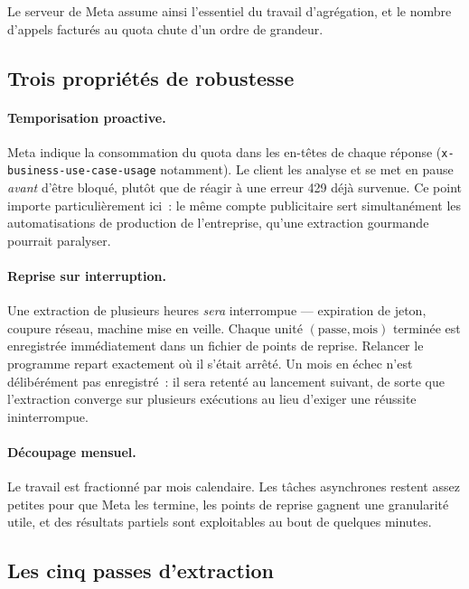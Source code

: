 \documentclass[11pt,a4paper]{article}
\newcommand{\code}[1]{\texttt{\small #1}}
\begin{document}
Le serveur de Meta assume ainsi l'essentiel du travail d'agrégation, et le
nombre d'appels facturés au quota chute d'un ordre de grandeur.

\subsection{Trois propriétés de robustesse}

\paragraph{Temporisation proactive.}
Meta indique la consommation du quota dans les en-têtes de chaque réponse
(\code{x-business-use-case-usage} notamment). Le client les analyse et se met en
pause \emph{avant} d'être bloqué, plutôt que de réagir à une erreur 429 déjà
survenue. Ce point importe particulièrement ici~: le même compte publicitaire
sert simultanément les automatisations de production de l'entreprise, qu'une
extraction gourmande pourrait paralyser.

\paragraph{Reprise sur interruption.}
Une extraction de plusieurs heures \emph{sera} interrompue --- expiration de
jeton, coupure réseau, machine mise en veille. Chaque unité
$(\text{passe},\text{mois})$ terminée est enregistrée immédiatement dans un
fichier de points de reprise. Relancer le programme repart exactement où il
s'était arrêté. Un mois en échec n'est délibérément pas enregistré~: il sera
retenté au lancement suivant, de sorte que l'extraction converge sur plusieurs
exécutions au lieu d'exiger une réussite ininterrompue.

\paragraph{Découpage mensuel.}
Le travail est fractionné par mois calendaire. Les tâches asynchrones restent
assez petites pour que Meta les termine, les points de reprise gagnent une
granularité utile, et des résultats partiels sont exploitables au bout de
quelques minutes.

\subsection{Les cinq passes d'extraction}
\end{document}
